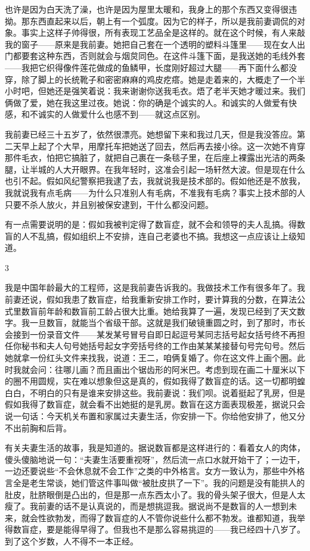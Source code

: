 也许是因为白天洗了澡，也许是因为屋里太暖和，我身上的那个东西又变得很违拗。那东西直起来以后，朝上有一个弧度。因为它的样子，所以是我前妻调侃的对象。事实上这样子帅得很，所有表现工艺品全是这样的。就在这个时候，有人来敲我的窗子——原来是我前妻。她把自己套在一个透明的塑料斗篷里——现在女人出门都要套这种东西，否则就会与烟炱同色。在这件斗篷下面，是我送她的毛线外套——我把它织得像件莲花做成的鱼鳞甲，长度刚好超过大腿——再下面什么都没穿，除了脚上的长统靴子和密密麻麻的鸡皮疙瘩。她是走着来的，大概走了一个半小时吧，但她还是强笑着说：我来谢谢你送我毛衣。焐了老半天她才暖过来。我们俩做了爱，她在我这里过夜。她说：你的确是个诚实的人。和诚实的人做爱有快感，和不诚实的人做爱什么也感不到——就这点区别。 

我前妻已经三十五岁了，依然很漂亮。她想留下来和我过几天，但是我没答应。第二天早上起了个大早，用摩托车把她送了回去，然后再去接小徐。这一次她不肯穿那件毛衣，怕把它搞脏了，就把自己裹在一条毯子里，在后座上裸露出光洁的两条腿，让半城的人大开眼界。在我年轻时，这准会引起一场轩然大波。但是现在什么也引不起。假如风纪警察把我逮了去，我就说我是技术部的。假如他还是不放我，我就说我有点毛病——为什么只准别人有毛病，不准我有毛病？事实上技术部的人只要不杀人放火，并且别被保安逮到，干什么都没问题。 

有一点需要说明的是：假如我被判定得了数盲症，就不会和领导的夫人乱搞。得数盲的人不乱搞，假如组织上不安排，连自己老婆也不搞。我想这一点应该让上级知道。 

3 

我是中国年龄最大的工程师，这是我前妻告诉我的。我做技术工作有很多年了。我前妻还说，假如我患了数盲症，给我重新安排工作时，要计算我的分数，在算法公式里数盲前年龄和数盲前工龄占很大比重。她给我算了一遍，发现已经到了天文数字。我一旦数盲，就能当个省级干部。这就是我们破镜重圆之时，到了那时，市长会接到一份录音文件——某发某号冒号自即日起逗号某同志括号起女括号终不再担任你秘书和夫人句号她括号起女字旁括号终的工作由某某某接替句号完句号。然后她就拿一份红头文件来找我，说道：王二，咱俩复婚了。你在这文件上画个圈。此时我就会问：往哪儿画？而且画出个锯齿形的阿米巴。考虑到现在画二十厘米以下的圈不用圆规，实在难以想象但这是真的，假如我得了数盲症的话。这一切都明蝗白白，不明白的只有是谁来安排这些。我前妻说：我们呗。说着挺起了乳房，但是假如我得了数盲症，就会看不出她挺的是乳房。数盲在这方面表现极差，据说只会说一句话：今天机关布置和家属过夫妻生活，你安排一下。你给他安排了，他又分不出前胸和后背。 

有关夫妻生活的故事，我是知道的。据说数盲都是这样进行的：看着女人的肉体，傻头傻脑地说一句：“夫妻生活要重视呀”，然后流一点口水就开始干了；一边干，一边还要说些“不会休息就不会工作”之类的中外格言。女方一致认为，那些中外格言全是老生常谈，她们管这件事叫做“被肚皮拱了一下”。我的问题是没有能拱人的肚皮，肚脐眼倒是凸出的，但是那一点东西太小了。我的骨头架子很大，但是人太瘦了。我前妻的话不是认真说的，而是想挑逗我。据说尚不是数盲的人一想到未来，就会性欲勃发，而得了数盲症的人不管你说些什么都不勃发。谁都知道，我举得数盲症，要是能得早得了。但我也不是那么容易挑逗的——我已经四十八岁了。到了这个岁数，人不得不一本正经。 


